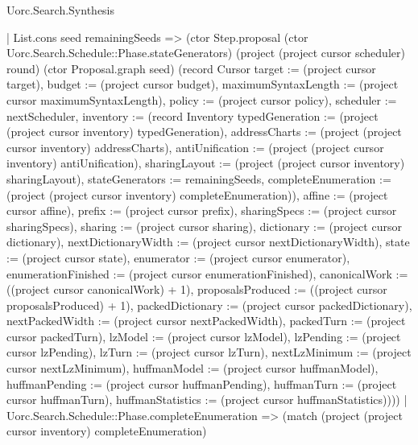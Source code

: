 \begin{lexlean}{Uorc.Search.Synthesis}
\begin{semanticmodule}
{      | List.cons seed remainingSeeds => (ctor Step.proposal (ctor Uorc.Search.Schedule::Phase.stateGenerators) (project (project cursor scheduler) round) (ctor Proposal.graph seed) (record Cursor {target := (project cursor target), budget := (project cursor budget), maximumSyntaxLength := (project cursor maximumSyntaxLength), policy := (project cursor policy), scheduler := nextScheduler, inventory := (record Inventory {typedGeneration := (project (project cursor inventory) typedGeneration), addressCharts := (project (project cursor inventory) addressCharts), antiUnification := (project (project cursor inventory) antiUnification), sharingLayout := (project (project cursor inventory) sharingLayout), stateGenerators := remainingSeeds, completeEnumeration := (project (project cursor inventory) completeEnumeration)}), affine := (project cursor affine), prefix := (project cursor prefix), sharingSpecs := (project cursor sharingSpecs), sharing := (project cursor sharing), dictionary := (project cursor dictionary), nextDictionaryWidth := (project cursor nextDictionaryWidth), state := (project cursor state), enumerator := (project cursor enumerator), enumerationFinished := (project cursor enumerationFinished), canonicalWork := ((project cursor canonicalWork) + 1), proposalsProduced := ((project cursor proposalsProduced) + 1), packedDictionary := (project cursor packedDictionary), nextPackedWidth := (project cursor nextPackedWidth), packedTurn := (project cursor packedTurn), lzModel := (project cursor lzModel), lzPending := (project cursor lzPending), lzTurn := (project cursor lzTurn), nextLzMinimum := (project cursor nextLzMinimum), huffmanModel := (project cursor huffmanModel), huffmanPending := (project cursor huffmanPending), huffmanTurn := (project cursor huffmanTurn), huffmanStatistics := (project cursor huffmanStatistics)})))
    | Uorc.Search.Schedule::Phase.completeEnumeration => (match (project (project cursor inventory) completeEnumeration)
}
\end{semanticmodule}
\end{lexlean}
